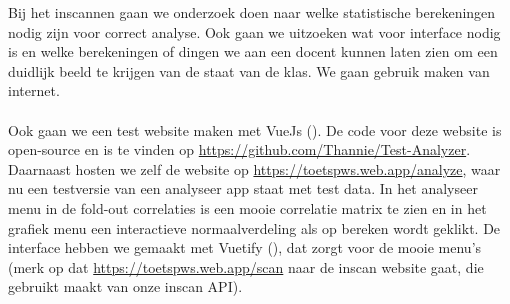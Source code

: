 \documentclass[12pt]{article}
\begin{document}
\begin{multicols}{2}
    
Bij het inscannen gaan we onderzoek doen naar welke statistische berekeningen nodig zijn voor correct analyse. Ook gaan we uitzoeken wat voor interface nodig is en welke berekeningen of dingen we aan een docent kunnen laten zien om een duidlijk beeld te krijgen van de staat van de klas. We gaan gebruik maken van internet. \\
\\
Ook gaan we een test website maken met VueJs (\cite{vuejsManual}). De code voor deze website is open-source en is te vinden op \url{https://github.com/Thannie/Test-Analyzer}.
Daarnaast hosten we zelf de website op \url{https://toetspws.web.app/analyze}, waar nu een testversie van een analyseer app staat met test data. In het analyseer menu in de fold-out correlaties is een mooie correlatie matrix te zien en in het grafiek menu een interactieve normaalverdeling als op bereken wordt geklikt. De interface hebben we gemaakt met Vuetify (\cite{vuetifyManual}), dat zorgt voor de mooie menu's  (merk op dat \url{https://toetspws.web.app/scan} naar de inscan website gaat, die gebruikt maakt van onze inscan API).\\
\\
\end{multicols}

\pagebreak
\end{document}
